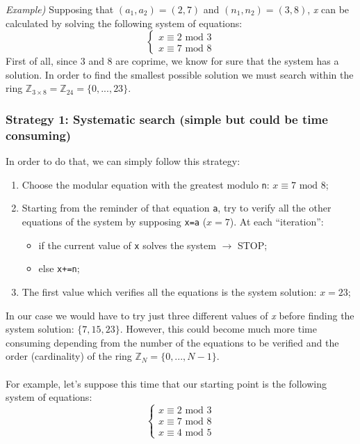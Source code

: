 \documentclass[11pt, a4paper]{article}
\newcommand{\doublequotes}[1]{“#1”}
\newcommand{\mymod}{
    \text{ mod }
}
\begin{document}
\newpage
\hfill\break
\textit{Example)} Supposing that $(a_1,a_2)=(2,7)$ and $(n_1,n_2)=(3,8)$, \textit{x} can be calculated by solving the following system of equations:
\begin{equation*}
    \begin{cases}
        x\equiv2\mymod3\\
        x\equiv7\mymod8
    \end{cases}
\end{equation*}
First of all, since 3 and 8 are coprime, we know for sure that the system has a solution. In order to find the smallest possible solution we must search within the ring $\mathbb{Z}_{3\times8}=\mathbb{Z}_{24}=\{0,...,23\}$.
\subsubsection*{Strategy 1: Systematic search (simple but could be time consuming)}
In order to do that, we can simply follow this strategy:
\begin{enumerate}
    \item Choose the modular equation with the greatest modulo \texttt{n}: $x\equiv7\mymod8$;
    \item Starting from the reminder of that equation \texttt{a}, try to verify all the other equations of the system by supposing \texttt{x=a} ($x=7$). At each \doublequotes{iteration}:
    \begin{itemize}
        \item if the current value of \texttt{x} solves the system $\rightarrow$ STOP;
        \item else \texttt{x+=n};
    \end{itemize}
    \item The first value which verifies all the equations is the system solution: $x=23$;
\end{enumerate}
In our case we would have to try just three different values of \textit{x} before finding the system solution: $\{7,15,23\}$. However, this could become much more time consuming depending from the number of the equations to be verified and the order (cardinality) of the ring $\mathbb{Z}_N=\{0,...,N-1\}$.\\\\
For example, let's suppose this time that our starting point is the following system of equations:
\begin{equation*}
    \begin{cases}
        x\equiv2\mymod3\\
        x\equiv7\mymod8\\
        x\equiv4\mymod5
    \end{cases}
\end{equation*}
\end{document}
